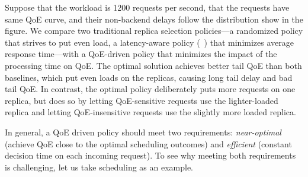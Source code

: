 Suppose that the workload is 1200 requests per second, that the requests have same QoE curve, and their non-backend delays follow the distribution show in the figure.
We compare two traditional replica selection policies---a randomized policy that strives to put even load, a latency-aware policy (\eg~\cite{suresh2015c3,wu2015costlo}) that minimizes average response time---with a QoE-driven policy that minimizes the impact of the processing time on QoE.
The optimal solution achieves better tail QoE than both baselines, which put even loads on the replicas, 
causing long tail delay and bad tail QoE.
In contrast, the optimal policy deliberately puts more requests on one replica, but does so by letting QoE-sensitive requests use the lighter-loaded replica and letting QoE-insensitive requests use the slightly more loaded replica. 





In general, a QoE driven policy should meet two requirements: {\em near-optimal} (\ie achieve QoE close to the optimal scheduling outcomes) and {\em efficient} (\ie constant decision time on each incoming request).
To see why meeting both requirements is challenging, let us take scheduling as an example.

